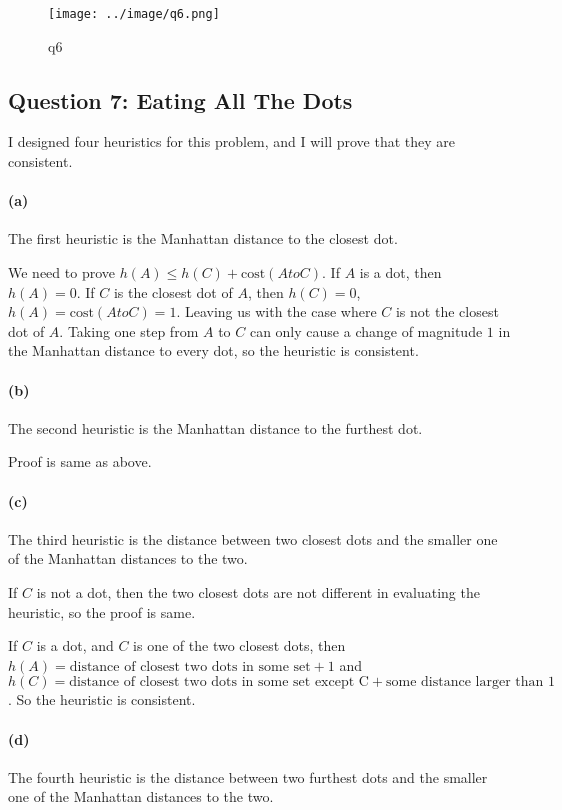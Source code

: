 \documentclass{article}
\begin{document}
\begin{figure}[H]
    \centering
    \texttt{[image: ../image/q6.png]}
    \caption{q6}
    \label{fig:q6}
\end{figure}

\subsection{Question 7: Eating All The Dots}
I designed four heuristics for this problem, and I will prove that they are consistent.

\paragraph*{(a)}
The first heuristic is the Manhattan distance to the closest dot.

We need to prove \(h(A) \leq h(C) + \text{cost} (A to C)\). 
If \(A\) is a dot, then \(h(A) = 0\). 
If \(C\) is the closest dot of \(A\), then \(h(C) = 0\), \(h(A) = \text{cost}(A to C) = 1\).
Leaving us with the case where \(C\) is not the closest dot of \(A\).
Taking one step from \(A\) to \(C\) can only cause a change of magnitude \(1\) in the Manhattan distance to every dot,
so the heuristic is consistent.
\paragraph*{(b)}
The second heuristic is the Manhattan distance to the furthest dot.

Proof is same as above.
\paragraph*{(c)}
The third heuristic is the distance between two closest dots and the smaller one of the Manhattan distances to the two.

If \(C\) is not a dot, then the two closest dots are not different in evaluating the heuristic, so the proof is same.

If \(C\) is a dot, and \(C\) is one of the two closest dots, then \(h(A) = \text{distance of closest two dots in some set} + 1\) and \(h(C) = \text{distance of closest two dots in some set except C} + \text{some distance larger than 1}\). 
So the heuristic is consistent.
\paragraph*{(d)}
The fourth heuristic is the distance between two furthest dots and the smaller one of the Manhattan distances to the two.
\end{document}
